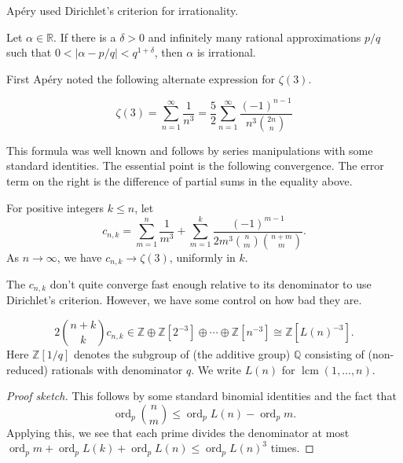 \documentclass[12 pt, letterpaper]{amsart}
\begin{document}
Ap\'ery used Dirichlet's criterion for irrationality.

\begin{theorem}[Dirichlet]
	Let $\alpha \in \mathbb{R}$. If there is a $\delta > 0$ and infinitely many rational approximations $p / q$ such that $0 < \lvert \alpha - p / q \rvert < q^{1 + \delta}$, then $\alpha$ is irrational.
\end{theorem}

First Ap\'ery noted the following alternate expression for $\zeta(3)$.

\begin{proposition}
	\[
		\zeta(3) = \sum_{n = 1}^{\infty} \frac{1}{n^{3}} = \frac{5}{2} \sum_{n = 1}^{\infty} \frac{(-1)^{n - 1}}{n^{3} \binom{2n}{n}}
	\]
\end{proposition}

This formula was well known and follows by series manipulations with some standard identities. The essential point is the following convergence. The error term on the right is the difference of partial sums in the equality above.

\begin{proposition}
	For positive integers $k \le n$, let
	\[
		c_{n, k} = \sum_{m = 1}^{n} \frac{1}{m^{3}} + \sum_{m = 1}^{k} \frac{(-1)^{m - 1}}{2m^{3} \binom{n}{m} \binom{n + m}{m}}.
	\]
	As $n \to \infty$, we have $c_{n, k} \to \zeta(3)$, uniformly in $k$.
\end{proposition}

The $c_{n, k}$ don't quite converge fast enough relative to its denominator to use Dirichlet's criterion. However, we have some control on how bad they are.

\begin{lemma}
	\[
		2 \binom{n + k}{k} c_{n, k} \in \mathbb{Z} \oplus \mathbb{Z}[2^{-3}] \oplus \cdots \oplus \mathbb{Z}[n^{-3}] \cong \mathbb{Z}[L(n)^{-3}].
	\]
	Here $\mathbb{Z}[1/q]$ denotes the subgroup of (the additive group) $\mathbb{Q}$ consisting of (non-reduced) rationals with denominator $q$. We write $L(n)$ for $\operatorname{lcm}(1, \dots, n)$.
\end{lemma}

\begin{proof}[Proof sketch]
	This follows by some standard binomial identities and the fact that
\[
	\operatorname{ord}_{p} \binom{n}{m} \le \operatorname{ord}_{p} L(n) - \operatorname{ord}_{p}m.
\]
Applying this, we see that each prime divides the denominator at most $\operatorname{ord}_{p} m + \operatorname{ord}_{p} L(k) + \operatorname{ord}_{p} L(n) \le \operatorname{ord}_{p} L(n)^{3}$ times.
\end{proof}
\end{document}
